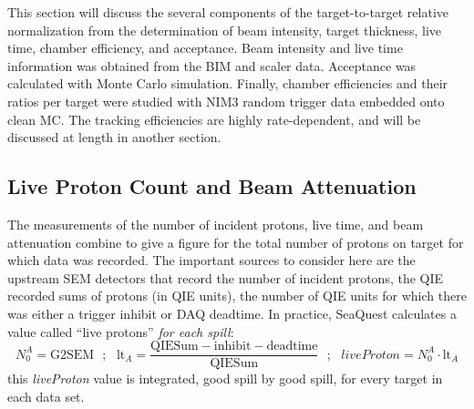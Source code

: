 This section will discuss the several components of the target-to-target relative normalization from the determination of beam intensity, target thickness, live time, chamber efficiency, and acceptance. Beam intensity and live time information was obtained from the BIM and scaler data. Acceptance was calculated with Monte Carlo simulation. Finally, chamber efficiencies and their ratios per target were studied with NIM3 random trigger data embedded onto clean MC. The tracking efficiencies are highly rate-dependent, and will be discussed at length in another section.

\subsection{Live Proton Count and Beam Attenuation}

The measurements of the number of incident protons, live time, and beam attenuation combine to give a figure for the total number of protons on target for which data was recorded. The important sources to consider here are the upstream SEM detectors that record the number of incident protons, the QIE recorded sums of protons (in QIE units), the number of QIE units for which there was either a trigger inhibit or DAQ deadtime. In practice, SeaQuest calculates a value called ``live protons'' \emph{for each spill}:
\begin{equation}
 N_0^A = \text{G2SEM}\ \ \ ;\ \ \ \text{lt}_A = 
 \frac{\text{QIESum} - \text{inhibit} - \text{deadtime}}{\text{QIESum}}\ \ \ ;\ \ \ 
 liveProton = N_0^A \cdot \text{lt}_A
\end{equation}
this \emph{liveProton} value is integrated, good spill by good spill, for every target in each data set.


